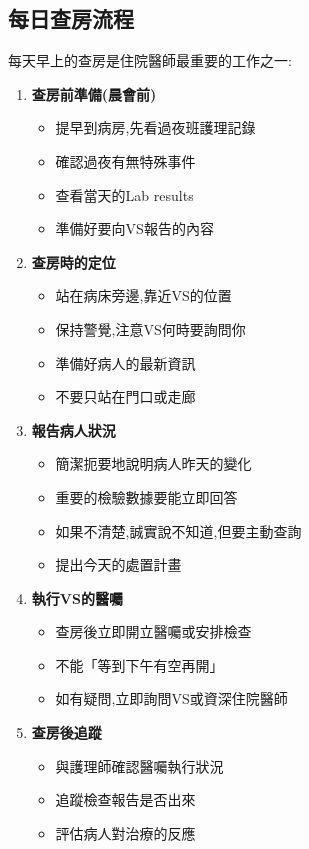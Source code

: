 \documentclass[12pt,a4paper]{article}
\begin{document}
\subsection{每日查房流程}

每天早上的查房是住院醫師最重要的工作之一:

\begin{enumerate}[leftmargin=*]
\item \textbf{查房前準備(晨會前)}
\begin{itemize}
\item 提早到病房,先看過夜班護理記錄
\item 確認過夜有無特殊事件
\item 查看當天的Lab results
\item 準備好要向VS報告的內容
\end{itemize}

\item \textbf{查房時的定位}
\begin{itemize}
\item 站在病床旁邊,靠近VS的位置
\item 保持警覺,注意VS何時要詢問你
\item 準備好病人的最新資訊
\item 不要只站在門口或走廊
\end{itemize}

\item \textbf{報告病人狀況}
\begin{itemize}
\item 簡潔扼要地說明病人昨天的變化
\item 重要的檢驗數據要能立即回答
\item 如果不清楚,誠實說不知道,但要主動查詢
\item 提出今天的處置計畫
\end{itemize}

\item \textbf{執行VS的醫囑}
\begin{itemize}
\item 查房後立即開立醫囑或安排檢查
\item 不能「等到下午有空再開」
\item 如有疑問,立即詢問VS或資深住院醫師
\end{itemize}

\item \textbf{查房後追蹤}
\begin{itemize}
\item 與護理師確認醫囑執行狀況
\item 追蹤檢查報告是否出來
\item 評估病人對治療的反應
\end{itemize}
\end{enumerate}
\end{document}
